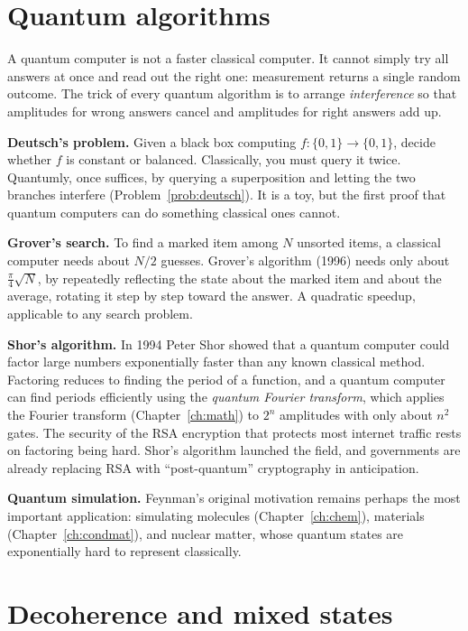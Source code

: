 \section{Quantum algorithms}

A quantum computer is not a faster classical computer. It cannot simply try all answers at once and read out the right one: measurement returns a single random outcome. The trick of every quantum algorithm is to arrange \emph{interference} so that amplitudes for wrong answers cancel and amplitudes for right answers add up.

\textbf{Deutsch's problem.} Given a black box computing $f:\{0,1\}\to\{0,1\}$, decide whether $f$ is constant or balanced. Classically, you must query it twice. Quantumly, once suffices, by querying a superposition and letting the two branches interfere (Problem~\ref{prob:deutsch}). It is a toy, but the first proof that quantum computers can do something classical ones cannot.

\textbf{Grover's search.} To find a marked item among $N$ unsorted items, a classical computer needs about $N/2$ guesses. Grover's algorithm (1996) needs only about $\tfrac\pi4\sqrt N$, by repeatedly reflecting the state about the marked item and about the average, rotating it step by step toward the answer. A quadratic speedup, applicable to any search problem.

\textbf{Shor's algorithm.} In 1994 Peter Shor showed that a quantum computer could factor large numbers exponentially faster than any known classical method. Factoring reduces to finding the period of a function, and a quantum computer can find periods efficiently using the \emph{quantum Fourier transform}, which applies the Fourier transform (Chapter~\ref{ch:math}) to $2^n$ amplitudes with only about $n^2$ gates. The security of the RSA encryption that protects most internet traffic rests on factoring being hard. Shor's algorithm launched the field, and governments are already replacing RSA with ``post-quantum'' cryptography in anticipation.

\textbf{Quantum simulation.} Feynman's original motivation remains perhaps the most important application: simulating molecules (Chapter~\ref{ch:chem}), materials (Chapter~\ref{ch:condmat}), and nuclear matter, whose quantum states are exponentially hard to represent classically.

\section{Decoherence and mixed states}

